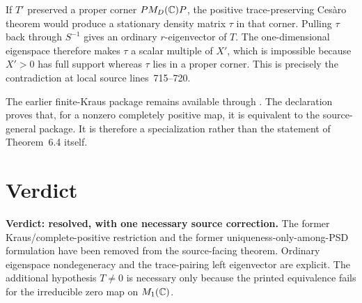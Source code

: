 \documentclass[11pt]{article}
\begin{document}
If $T'$ preserved a proper corner $PM_{D}(\mathbb{C})P$, the positive trace-preserving
Ces\`aro theorem
 would
produce a stationary density matrix $\tau$ in that corner.  Pulling $\tau$
back through $S^{-1}$ gives an ordinary $r$-eigenvector of $T$.  The
one-dimensional eigenspace therefore makes $\tau$ a scalar multiple of $X'$,
which is impossible because $X'>0$ has full support whereas $\tau$ lies in a
proper corner.  This is precisely the contradiction at local source
lines~715--720.

The earlier finite-Kraus package remains available through
.  The declaration
 proves that,
for a nonzero completely positive map, it is equivalent to the source-general
package.  It is therefore a specialization rather than the statement of
Theorem~6.4 itself.

\section{Verdict}

\textbf{Verdict: resolved, with one necessary source correction.}  The former
Kraus/complete-positive restriction and the former uniqueness-only-among-PSD
formulation have been removed from the source-facing theorem.  Ordinary
eigenspace nondegeneracy and the trace-pairing left eigenvector are explicit.
The additional hypothesis $T\neq0$ is necessary only because the printed
equivalence fails for the irreducible zero map on $M_{1}(\mathbb{C})$.



\end{document}
